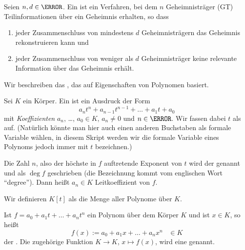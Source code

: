 \begin{definition}
 Seien $n, d \in \N$. Ein  ist ein Verfahren, bei dem $n$ Geheimnisträger (GT) Teilinformationen über ein Geheimnis erhalten, so dass 
 \begin{enumerate}
  \item jeder Zusammenschluss von mindestens $d$ Geheimnisträgern das Geheimnis rekonstruieren kann und
  \item jeder Zusammenschluss von weniger als $d$ Geheimnisträger keine relevante Information über das Geheimnis erhält.
 \end{enumerate}

\end{definition}

Wir beschreiben das , das auf Eigenschaften von Polynomen basiert.

\begin{definition}[Polynome]\label{def:polynom2}
 Sei $K$ ein Körper. Ein  ist ein Ausdruck der Form
 \[a_nt^n + a_{n-1}t^{n-1} + \dotsc + a_1t +a_0\]
 mit \emph{Koeffizienten} $a_n$, \dots, $a_0 \in K$, $a_n ≠ 0$ und $n \in \N$. Wir fassen dabei $t$ als  auf. (Natürlich könnte man hier auch einen anderen Buchstaben als formale Variable wählen, in diesem Skript werden wir die formale Variable eines Polynoms jedoch immer mit $t$ bezeichnen.)
 
 Die Zahl $n$, also der höchste in $f$ auftretende Exponent von $t$ wird der  genannt und als $\deg f$ geschrieben (die Bezeichnung kommt vom englischen Wort \enquote{degree}). Dann heißt $a_n \in K$ Leitkoeffizient von $f$.
 
 Wir definieren $K[t]$ als die Menge aller Polynome über $K$. 
 \end{definition}

\begin{definition}[Polynomfunktion]\label{def:polynomfunktion}
 Ist $f = a_0 + a_1t + \dotsc + a_nt^n$ ein Polynom über dem Körper $K$ und ist $x \in K$, so heißt
 \[f(x):= a_0 + a_1x + \dotsc + a_nx^n \; \; \; \in K\]
 der . Die zugehörige Funktion $K → K$, $x ↦ f(x)$, wird eine  genannt.
\end{definition}

